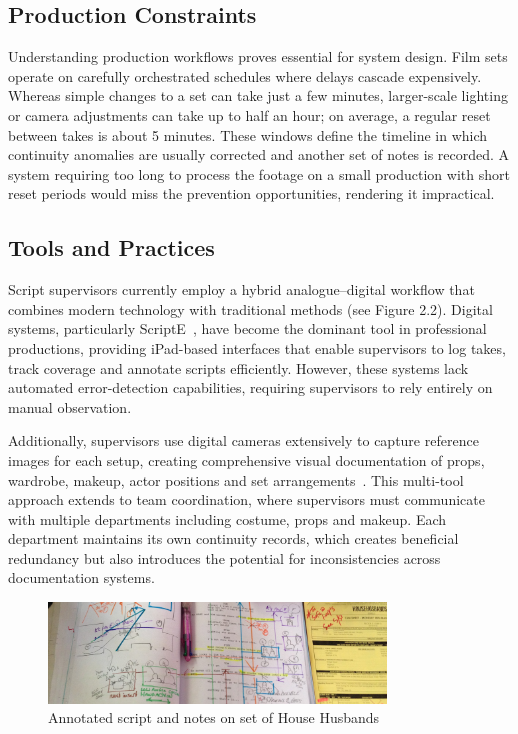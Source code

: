 \subsection{Production Constraints}

Understanding production workflows proves essential for system design. Film sets operate on carefully orchestrated schedules where delays cascade expensively. Whereas simple changes to a set can take just a few minutes, larger-scale lighting or camera adjustments can take up to half an hour; on average, a regular reset between takes is about 5 minutes. These windows define the timeline in which continuity anomalies are usually corrected and another set of notes is recorded. A system requiring too long to process the footage on a small production with short reset periods would miss the prevention opportunities, rendering it impractical.

\subsection{Tools and Practices}

Script supervisors currently employ a hybrid analogue–digital workflow that combines modern technology with traditional methods (see Figure 2.2). Digital systems, particularly ScriptE~\cite{scriptesystems2024}, have become the dominant tool in professional productions, providing iPad-based interfaces that enable supervisors to log takes, track coverage and annotate scripts efficiently. However, these systems lack automated error-detection capabilities, requiring supervisors to rely entirely on manual observation.

Additionally, supervisors use digital cameras extensively to capture reference images for each setup, creating comprehensive visual documentation of props, wardrobe, makeup, actor positions and set arrangements~\cite{scriptation2025}. This multi-tool approach extends to team coordination, where supervisors must communicate with multiple departments including costume, props and makeup. Each department maintains its own continuity records, which creates beneficial redundancy but also introduces the potential for inconsistencies across documentation systems.

\begin{figure}[h]
\centering
\includegraphics[width=0.8\textwidth]{figures/script_annotations.jpg}
\caption{Annotated script and notes on set of House Husbands~\cite{mskemosabi2013}}
\label{fig:script-notes}
\end{figure}

